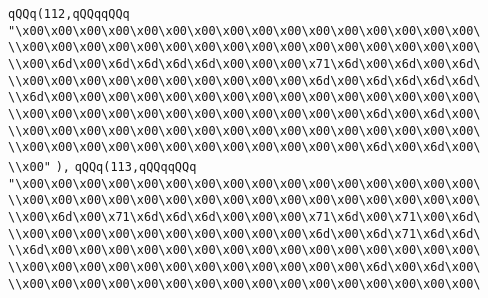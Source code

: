 \verb|qQQq(112,qQQqqQQq|\newline
\verb|"\x00\x00\x00\x00\x00\x00\x00\x00\x00\x00\x00\x00\x00\x00\x00\x00\|\newline
\verb|\\x00\x00\x00\x00\x00\x00\x00\x00\x00\x00\x00\x00\x00\x00\x00\x00\|\newline
\verb|\\x00\x6d\x00\x6d\x6d\x6d\x6d\x00\x00\x00\x71\x6d\x00\x6d\x00\x6d\|\newline
\verb|\\x00\x00\x00\x00\x00\x00\x00\x00\x00\x00\x6d\x00\x6d\x6d\x6d\x6d\|\newline
\verb|\\x6d\x00\x00\x00\x00\x00\x00\x00\x00\x00\x00\x00\x00\x00\x00\x00\|\newline
\verb|\\x00\x00\x00\x00\x00\x00\x00\x00\x00\x00\x00\x00\x6d\x00\x6d\x00\|\newline
\verb|\\x00\x00\x00\x00\x00\x00\x00\x00\x00\x00\x00\x00\x00\x00\x00\x00\|\newline
\verb|\\x00\x00\x00\x00\x00\x00\x00\x00\x00\x00\x00\x00\x6d\x00\x6d\x00\|\newline
\verb|\\x00"|\newline
\verb|),|\newline
\verb|qQQq(113,qQQqqQQq|\newline
\verb|"\x00\x00\x00\x00\x00\x00\x00\x00\x00\x00\x00\x00\x00\x00\x00\x00\|\newline
\verb|\\x00\x00\x00\x00\x00\x00\x00\x00\x00\x00\x00\x00\x00\x00\x00\x00\|\newline
\verb|\\x00\x6d\x00\x71\x6d\x6d\x6d\x00\x00\x00\x71\x6d\x00\x71\x00\x6d\|\newline
\verb|\\x00\x00\x00\x00\x00\x00\x00\x00\x00\x00\x6d\x00\x6d\x71\x6d\x6d\|\newline
\verb|\\x6d\x00\x00\x00\x00\x00\x00\x00\x00\x00\x00\x00\x00\x00\x00\x00\|\newline
\verb|\\x00\x00\x00\x00\x00\x00\x00\x00\x00\x00\x00\x00\x6d\x00\x6d\x00\|\newline
\verb|\\x00\x00\x00\x00\x00\x00\x00\x00\x00\x00\x00\x00\x00\x00\x00\x00\|\newline
